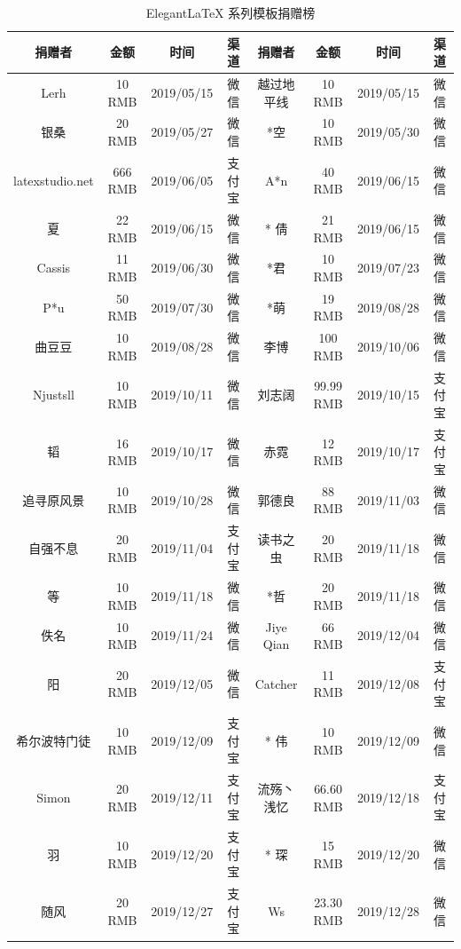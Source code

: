 \documentclass[cn,hazy,blue,10.5pt,normal]{elegantnote}
\begin{document}
\begin{table}[htbp]
  \scriptsize
  \centering
  \caption{Elegant\LaTeX{} 系列模板捐赠榜}
    \begin{tabular}{*{8}{>{\scriptsize}c}}
    \toprule
    \textbf{捐赠者} & \textbf{金额} & \textbf{时间} & \textbf{渠道} & \textbf{捐赠者} & \textbf{金额} & \textbf{时间} & \textbf{渠道} \\
    \midrule
    Lerh  & 10 RMB & 2019/05/15 & 微信    & 越过地平线 & 10 RMB & 2019/05/15 & 微信 \\
    银桑    & 20 RMB & 2019/05/27 & 微信    & *空    & 10 RMB & 2019/05/30 & 微信 \\
    latexstudio.net & 666 RMB & 2019/06/05 & 支付宝   & A*n   & 40 RMB & 2019/06/15 & 微信 \\
    * 夏   & 22 RMB & 2019/06/15 & 微信    & * 倩   & 21 RMB  & 2019/06/15 & 微信 \\
    Cassis & 11 RMB & 2019/06/30 & 微信    & *君    & 10 RMB & 2019/07/23 & 微信 \\
    P*u   & 50 RMB & 2019/07/30 & 微信    & *萌    & 19 RMB & 2019/08/28 & 微信 \\
    曲豆豆   & 10 RMB & 2019/08/28 & 微信    & 李博    & 100 RMB & 2019/10/06 & 微信 \\
    Njustsll & 10 RMB & 2019/10/11 & 微信    & 刘志阔   & 99.99 RMB & 2019/10/15 & 支付宝 \\
    * 韬   & 16 RMB & 2019/10/17 & 微信    & 赤霓    & 12 RMB & 2019/10/17 & 支付宝 \\
    追寻原风景 & 10 RMB & 2019/10/28 & 微信    & 郭德良   & 88 RMB & 2019/11/03 & 微信 \\
    自强不息  & 20 RMB & 2019/11/04 & 支付宝   & 读书之虫  & 20 RMB & 2019/11/18 & 微信 \\
    *等    & 10 RMB & 2019/11/18 & 微信    & *哲    & 20 RMB & 2019/11/18 & 微信 \\
    佚名    & 10 RMB & 2019/11/24 & 微信    & Jiye Qian & 66 RMB & 2019/12/04 & 微信 \\
    * 阳   & 20 RMB & 2019/12/05 & 微信    & Catcher & 11 RMB & 2019/12/08 & 支付宝 \\
    希尔波特门徒 & 10 RMB & 2019/12/09 & 支付宝   & * 伟   & 10 RMB & 2019/12/09 & 微信 \\
    Simon & 20 RMB & 2019/12/11 & 支付宝   & 流殇丶浅忆 & 66.60 RMB & 2019/12/18 & 支付宝 \\
    羽     & 10 RMB & 2019/12/20 & 支付宝   & * 琛   & 15 RMB & 2019/12/20 & 微信 \\
    随风    & 20 RMB & 2019/12/27 & 支付宝   & Ws    & 23.30 RMB & 2019/12/28 & 微信 \\

\end{tabular}
\end{table}
\end{document}
